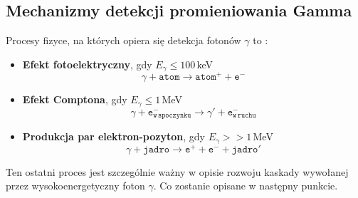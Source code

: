 \documentclass[a4paper,11pt,twoside]{article}
\begin{document}
\subsection{Mechanizmy detekcji promieniowania Gamma}
Procesy fizyce, na których opiera się detekcja fotonów $\gamma$ to \cite{astro_particle}:
\begin{itemize}
\item {\bf{Efekt fotoelektryczny}}, gdy $E_{\gamma} \leq 100$\,keV
\begin{equation}
\gamma + \mathtt{atom} \rightarrow \mathtt{atom^+} + \mathtt{e^-}
\end{equation}
\item {\bf{Efekt Comptona}}, gdy $E_{\gamma} \leq 1$\,MeV
\begin{equation}
\gamma + \mathtt{e^{-}_{w\,spoczynku}} \rightarrow \gamma' + \mathtt{e^{-}_{w\,ruchu}}
\end{equation}
\item {\bf{Produkcja par elektron-pozyton}}, gdy $E_{\gamma} >> 1$\,MeV
\begin{equation}
\gamma + \mathtt{jadro} \rightarrow \mathtt{e^+} + \mathtt{e^-} + \mathtt{jadro'}
\end{equation}
\end{itemize}
Ten ostatni proces jest szczególnie ważny w opisie rozwoju kaskady wywołanej przez wysokoenergetyczny foton $\gamma$. Co zostanie opisane w następny punkcie.
\end{document}
